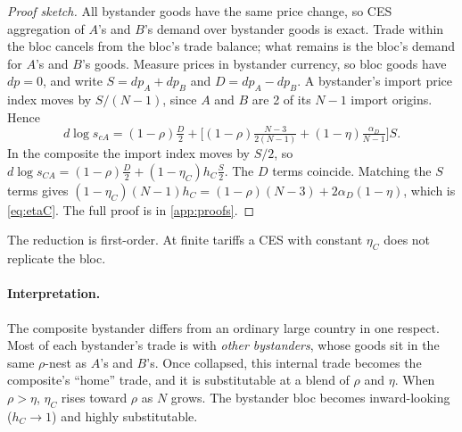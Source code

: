\begin{proof}[Proof sketch]
All bystander goods have the same price change, so CES aggregation of $A$'s and $B$'s demand over bystander goods is exact. Trade within the bloc cancels from the bloc's trade balance; what remains is the bloc's demand for $A$'s and $B$'s goods. Measure prices in bystander currency, so bloc goods have $dp=0$, and write $S=dp_A+dp_B$ and $D=dp_A-dp_B$. A bystander's import price index moves by $S/(N-1)$, since $A$ and $B$ are 2 of its $N-1$ import origins. Hence
\begin{equation*}
d\log s_{cA}=(1-\rho)\tfrac{D}{2}+\Big[(1-\rho)\tfrac{N-3}{2(N-1)}+(1-\eta)\tfrac{\alpha_D}{N-1}\Big]S.
\end{equation*}
In the composite the import index moves by $S/2$, so $d\log s_{CA}=(1-\rho)\frac D2+(1-\eta_C)h_C\frac S2$. The $D$ terms coincide. Matching the $S$ terms gives $(1-\eta_C)(N-1)h_C=(1-\rho)(N-3)+2\alpha_D(1-\eta)$, which is \cref{eq:etaC}. The full proof is in \cref{app:proofs}.
\end{proof}

The reduction is first-order. At finite tariffs a CES with constant $\eta_C$ does not replicate the bloc.

\paragraph{Interpretation.} The composite bystander differs from an ordinary large country in one respect. Most of each bystander's trade is with \emph{other bystanders}, whose goods sit in the same $\rho$-nest as $A$'s and $B$'s. Once collapsed, this internal trade becomes the composite's ``home'' trade, and it is substitutable at a blend of $\rho$ and $\eta$. When $\rho>\eta$, $\eta_C$ rises toward $\rho$ as $N$ grows. The bystander bloc becomes inward-looking ($h_C\to1$) and highly substitutable.

